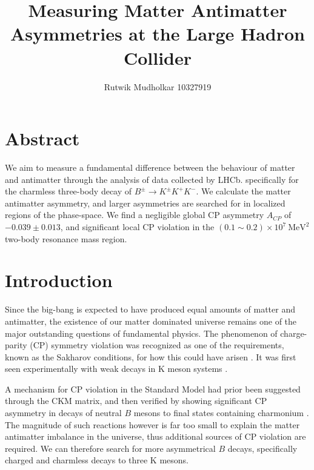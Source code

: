 \documentclass[11pt, twocolumn]{article}
\title{Measuring Matter Antimatter Asymmetries at the Large Hadron Collider}
\author{Rutwik Mudholkar 10327919}
\begin{document}
\maketitle

\onehalfspacing
\setlength\parindent{0pt}

\section*{Abstract}
We aim to measure a fundamental difference between the behaviour of
matter and antimatter through the analysis of data collected by LHCb. specifically for the charmless three-body decay of $B^{\pm} \rightarrow K^{\pm}K^{+}K^{-}$. We calculate the matter antimatter asymmetry, and larger asymmetries are searched for in localized regions of the phase-space. We find a negligible global CP asymmetry $A_{CP}$ of $−0.039 \pm 0.013$, and significant local CP violation in the $(0.1\sim0.2) \times 10^7 \ \mathrm{MeV}^2$ two-body resonance mass region.  

\section{Introduction}

Since the big-bang is expected to have produced equal amounts of matter and antimatter, the existence of our matter dominated universe remains one of the major outstanding questions of fundamental physics. The phenomenon of charge-parity (CP) symmetry violation was recognized as one of the requirements, known as the Sakharov conditions, for how this could have arisen \cite{universe}. It was first seen experimentally with weak decays in K meson systems \cite{first}.\newline

A mechanism for CP violation in the Standard Model had prior been suggested through the CKM matrix, and then verified by showing significant CP asymmetry in decays of neutral $B$ mesons to final states containing charmonium \cite{charmonium}. The magnitude of such reactions however is far too small to explain the matter antimatter imbalance in the universe, thus additional sources of CP violation are required. We can therefore search for more asymmetrical $B$ decays, specifically charged and charmless decays to three K mesons. 
\end{document}

